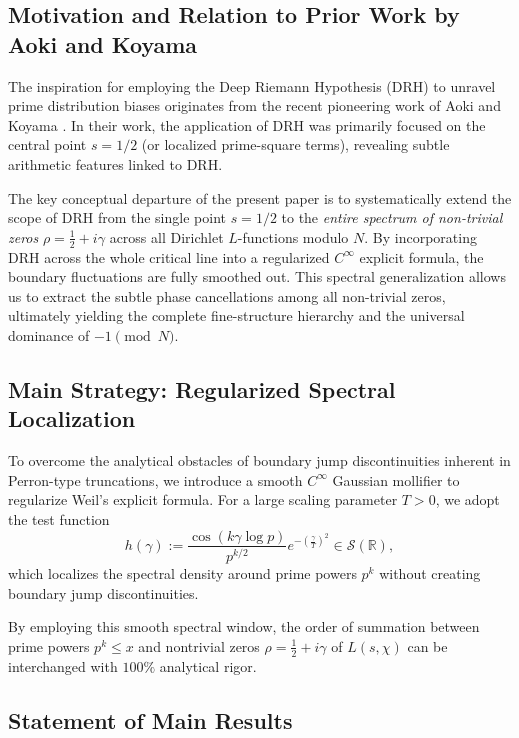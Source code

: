 \documentclass[12pt,reqno]{amsart}
\theoremstyle{definition}
\theoremstyle{remark}
\numberwithin{equation}{section}
\begin{document}
\subsection{Motivation and Relation to Prior Work by Aoki and Koyama}

The inspiration for employing the Deep Riemann Hypothesis (DRH) to unravel prime distribution biases originates from the recent pioneering work of Aoki and Koyama \cite{AK23}. In their work, the application of DRH was primarily focused on the central point $s = 1/2$ (or localized prime-square terms), revealing subtle  arithmetic features linked to DRH.

The key conceptual departure of the present paper is to systematically extend the scope of DRH from the single point $s = 1/2$ to the \emph{entire spectrum of non-trivial zeros} $\rho = \frac{1}{2} + i\gamma$ across all Dirichlet $L$-functions modulo $N$. By incorporating DRH across the whole critical line into a regularized $C^\infty$ explicit formula, the boundary fluctuations are fully smoothed out. This spectral generalization allows us to extract the subtle phase cancellations among all non-trivial zeros, ultimately yielding the complete fine-structure hierarchy and the universal dominance of $-1 \pmod N$.

\subsection{Main Strategy: Regularized Spectral Localization}

To overcome the analytical obstacles of boundary jump discontinuities inherent in Perron-type truncations, we introduce a smooth $C^\infty$ Gaussian mollifier to regularize Weil's explicit formula. For a large scaling parameter $T > 0$, we adopt the test function
\begin{equation}
h(\gamma) := \frac{\cos(k \gamma \log p)}{p^{k/2}} e^{-\left(\frac{\gamma}{T}\right)^2} \in \mathcal{S}(\mathbb{R}),
\end{equation}
which localizes the spectral density around prime powers $p^k$ without creating boundary jump discontinuities. 

By employing this smooth spectral window, the order of summation between prime powers $p^k \le x$ and nontrivial zeros $\rho = \frac{1}{2} + i\gamma$ of $L(s, \chi)$ can be interchanged with $100\%$ analytical rigor.

\subsection{Statement of Main Results}
\end{document}
